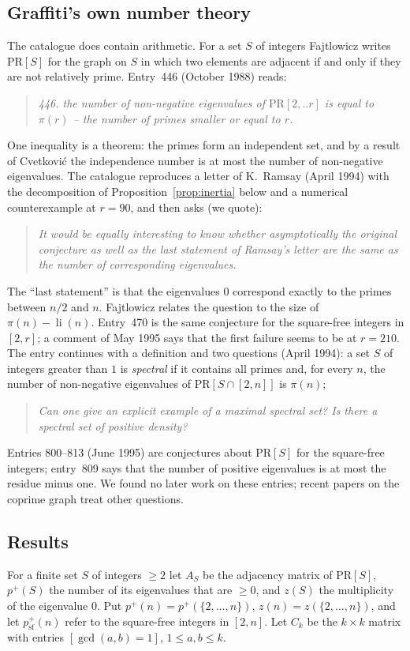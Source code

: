 \documentclass[11pt]{amsart}
\theoremstyle{definition}
\theoremstyle{remark}
\newcommand{\PR}{\mathrm{PR}}
\newcommand{\pp}{p^{+}}
\begin{document}
\subsection{Graffiti's own number theory}
The catalogue \cite{WOW} does contain arithmetic. For a set $S$ of integers Fajtlowicz writes $\PR[S]$ for the graph on $S$ in which two elements are adjacent if and only if they are not relatively prime. Entry~446 (October 1988) reads:
\begin{quote}\itshape
446. the number of non-negative eigenvalues of $\PR[2,..r]$ is equal to $\pi(r)$ -- the number of primes smaller or equal to $r$.
\end{quote}
One inequality is a theorem: the primes form an independent set, and by a result of Cvetkovi\'c the independence number is at most the number of non-negative eigenvalues. The catalogue reproduces a letter of K.~Ramsay (April 1994) with the decomposition of Proposition~\ref{prop:inertia} below and a numerical counterexample at $r=90$, and then asks (we quote):
\begin{quote}\itshape
It would be equally interesting to know whether asymptotically the original conjecture as well as the last statement of Ramsay's letter are the same as the number of corresponding eigenvalues.
\end{quote}
The ``last statement'' is that the eigenvalues $0$ correspond exactly to the primes between $n/2$ and $n$. Fajtlowicz relates the question to the size of $\pi(n)-\operatorname{li}(n)$. Entry~470 is the same conjecture for the square-free integers in $[2,r]$; a comment of May 1995 says that the first failure seems to be at $r=210$. The entry continues with a definition and two questions (April 1994): a set $S$ of integers greater than $1$ is \emph{spectral} if it contains all primes and, for every $n$, the number of non-negative eigenvalues of $\PR[S\cap[2,n]]$ is $\pi(n)$;
\begin{quote}\itshape
Can one give an explicit example of a maximal spectral set? Is there a spectral set of positive density?
\end{quote}
Entries 800--813 (June 1995) are conjectures about $\PR[S]$ for the square-free integers; entry~809 says that the number of positive eigenvalues is at most the residue minus one. We found no later work on these entries; recent papers on the coprime graph \cite{SS,CG} treat other questions.

\subsection{Results}
For a finite set $S$ of integers $\ge2$ let $A_S$ be the adjacency matrix of $\PR[S]$, $\pp(S)$ the number of its eigenvalues that are $\ge0$, and $z(S)$ the multiplicity of the eigenvalue $0$. Put $\pp(n)=\pp(\{2,\dots,n\})$, $z(n)=z(\{2,\dots,n\})$, and let $\pp_{\mathrm{sf}}(n)$ refer to the square-free integers in $[2,n]$. Let $C_k$ be the $k\times k$ matrix with entries $[\gcd(a,b)=1]$, $1\le a,b\le k$.
\end{document}
